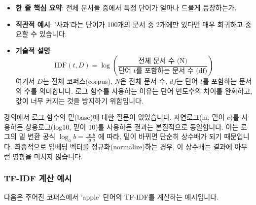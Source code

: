 \documentclass[11pt,a4paper]{article}
\theoremstyle{definition}
\begin{document}
\begin{itemize}
    \item \textbf{한 줄 핵심 요약}: 전체 문서들 중에서 특정 단어가 얼마나 드물게 등장하는가.
    \item \textbf{직관적 예시}: '사과'라는 단어가 100개의 문서 중 2개에만 있다면 매우 희귀하고 중요할 수 있습니다.
    \item \textbf{기술적 설명}:
        \begin{equation*}
        \text{IDF}(t, D) = \log\left(\frac{\text{전체 문서 수 (N)}}{\text{단어 } t \text{를 포함하는 문서 수 (df)}}\right)
        \end{equation*}
        여기서 $D$는 전체 코퍼스(corpus), $N$은 전체 문서 수, $df$는 단어 $t$를 포함하는 문서의 수를 의미합니다. 로그 함수를 사용하는 이유는 단어 빈도수의 차이를 완화하고, 값이 너무 커지는 것을 방지하기 위함입니다.
\end{itemize}

\begin{infobox}
강의에서 로그 함수의 밑(base)에 대한 질문이 있었습니다. 자연로그(ln, 밑이 $e$)를 사용하든 상용로그(log10, 밑이 10)를 사용하든 결과는 본질적으로 동일합니다. 이는 로그의 밑 변환 공식 $\log_a b = \frac{\ln b}{\ln a}$ 에 따라, 밑이 바뀌면 단순히 상수배가 되기 때문입니다. 최종적으로 임베딩 벡터를 정규화(normalize)하는 경우, 이 상수배는 결과에 아무런 영향을 미치지 않습니다.
\end{infobox}

\subsubsection{TF-IDF 계산 예시}
다음은 주어진 코퍼스에서 'apple' 단어의 TF-IDF를 계산하는 예시입니다.
\end{document}
